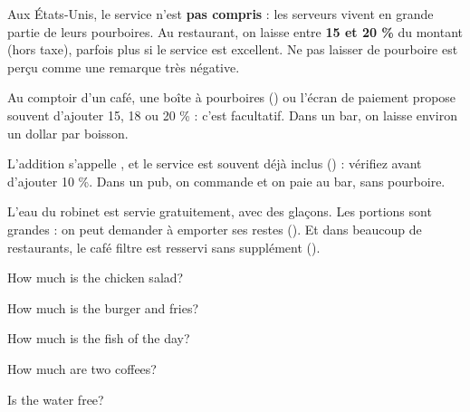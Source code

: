 
\begin{culture}
Aux États-Unis, le service n'est \textbf{pas compris} : les serveurs vivent en grande partie de leurs
pourboires. Au restaurant, on laisse entre \textbf{15 et 20 \%} du montant (hors taxe), parfois plus si
le service est excellent. Ne pas laisser de pourboire est perçu comme une remarque très négative.
\end{culture}

\begin{paire}
\begin{culture}[Ailleurs]
Au comptoir d'un café, une boîte à pourboires () ou l'écran de paiement propose souvent
d'ajouter 15, 18 ou 20 \% : c'est facultatif. Dans un bar, on laisse environ un dollar par boisson.
\end{culture}
\begin{culture}
L'addition s'appelle , et le service est souvent déjà inclus () :
vérifiez avant d'ajouter 10 \%. Dans un pub, on commande et on paie au bar, sans pourboire.
\end{culture}
\end{paire}

\begin{culture}
L'eau du robinet est servie gratuitement, avec des glaçons. Les portions sont grandes : on peut
demander à emporter ses restes (). Et dans beaucoup de restaurants, le
café filtre est resservi sans supplément ().
\end{culture}


\begin{center}\otMenu\end{center}
\begin{questions}
\item How much is the chicken salad? \hfill {}
\item How much is the burger and fries? \hfill {}
\item How much is the fish of the day? \hfill {}
\item How much are two coffees? \hfill {}
\item Is the water free? \hfill {}
\end{questions}

